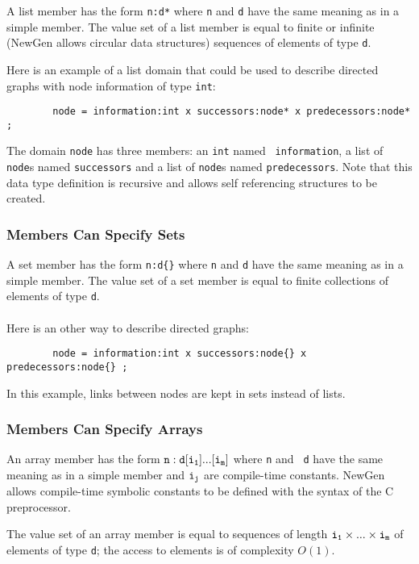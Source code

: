 A list member has the form {\tt n:d*} where {\tt n} and {\tt d} have the
same meaning as in a simple member. The value set of a list member is
equal to finite or infinite (NewGen allows circular data structures)
sequences of elements of type {\tt d}.

Here is an example of a list domain that could be used to describe
directed graphs with node information of type {\tt int}:
\begin{verbatim}
        node = information:int x successors:node* x predecessors:node* ;
\end{verbatim}
The domain {\tt node} has three members: an {\tt int} named {\tt
information}, a list of {\tt node}s named {\tt successors} and a list
of {\tt node}s named {\tt predecessors}. Note that this data type
definition is recursive and allows self referencing structures to be
created.

\subsubsection*{Members Can Specify Sets}

A set member has the form {\tt n:d\{\}} where {\tt n} and {\tt d} have the
same meaning as in a simple member. The value set of a set member is
equal to finite collections of elements of type {\tt d}.

\paragraph{}
Here is an other way to describe directed graphs:
\begin{verbatim}
        node = information:int x successors:node{} x predecessors:node{} ;
\end{verbatim}
In this example, links between nodes are kept in sets instead of lists.

\subsubsection*{Members Can Specify Arrays}

An array member has the form ${\tt n:d[i_1]...[i_m]}$ where {\tt n} and {\tt
d} have the same meaning as in a simple member and ${\tt i_j}$ are
compile-time constants.  NewGen allows compile-time symbolic constants
to be defined with the syntax of the C preprocessor.

The value set of an array member is equal to sequences of length ${\tt
i_1} \times ... \times {\tt i_m}$ of elements of type {\tt d}; the access to
elements is of complexity $O(1)$.

